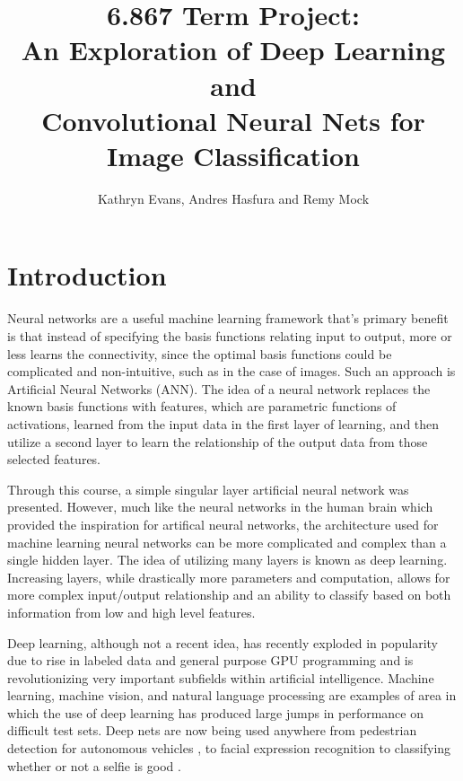\documentclass[12pt, twocolumn]{article}
\begin{document}
\title{ 6.867 Term Project: \\ An Exploration of Deep Learning and \\ Convolutional Neural Nets for Image Classification\\ }
 \author{Kathryn Evans, Andres Hasfura and Remy Mock}
\maketitle

\section{ Introduction} 
Neural networks are a useful machine learning framework that's primary benefit is that instead of specifying the basis functions relating input to output,  more or less learns the connectivity, since the optimal basis functions could be complicated and non-intuitive, such as in the case of images. Such an approach is Artificial Neural Networks (ANN). The idea of a neural network replaces the known basis functions with features, which are parametric functions of activations, learned from the input data in the first layer of learning, and then utilize a second layer to learn the relationship of the output data from those selected features.

Through this course, a simple singular layer artificial neural network was presented. However, much like the neural networks in the human brain which provided the inspiration for artifical neural networks, the architecture used for machine learning neural networks can be more complicated and complex than a single hidden layer. The idea of utilizing many layers is known as deep learning.  Increasing layers, while drastically more parameters and computation,  allows for more complex input/output relationship and an ability to classify based on both information from low and high level features.

Deep learning, although not a recent idea, has recently exploded in popularity due to rise in labeled data and general purpose GPU programming and is revolutionizing very important subfields within artificial intelligence. Machine learning, machine vision, and natural language processing are examples of area in which the use of deep learning has produced large jumps in performance on difficult test sets. Deep nets are now being used anywhere from pedestrian detection for autonomous vehicles \cite{Szarvas2006}, to facial expression recognition \cite{Li2015} to classifying whether or not a selfie is good \cite{Karpathy}. 
	
\end{document}
